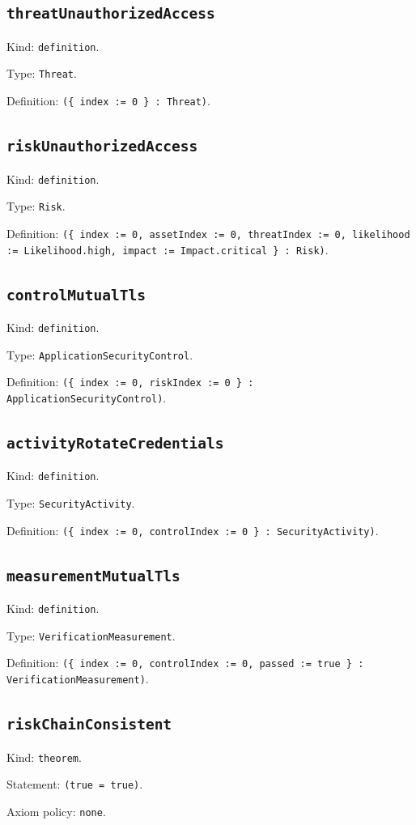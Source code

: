 \documentclass[11pt]{article}
\begin{document}
\subsection*{\texttt{threatUnauthorizedAccess}}
\noindent Kind: \texttt{definition}.\par
\noindent Type: \texttt{Threat}.\par
\noindent Definition: \texttt{(\{ index := 0 \} : Threat)}.\par
\subsection*{\texttt{riskUnauthorizedAccess}}
\noindent Kind: \texttt{definition}.\par
\noindent Type: \texttt{Risk}.\par
\noindent Definition: \texttt{(\{ index := 0, assetIndex := 0, threatIndex := 0, likelihood := Likelihood.high, impact := Impact.critical \} : Risk)}.\par
\subsection*{\texttt{controlMutualTls}}
\noindent Kind: \texttt{definition}.\par
\noindent Type: \texttt{ApplicationSecurityControl}.\par
\noindent Definition: \texttt{(\{ index := 0, riskIndex := 0 \} : ApplicationSecurityControl)}.\par
\subsection*{\texttt{activityRotateCredentials}}
\noindent Kind: \texttt{definition}.\par
\noindent Type: \texttt{SecurityActivity}.\par
\noindent Definition: \texttt{(\{ index := 0, controlIndex := 0 \} : SecurityActivity)}.\par
\subsection*{\texttt{measurementMutualTls}}
\noindent Kind: \texttt{definition}.\par
\noindent Type: \texttt{VerificationMeasurement}.\par
\noindent Definition: \texttt{(\{ index := 0, controlIndex := 0, passed := true \} : VerificationMeasurement)}.\par
\subsection*{\texttt{riskChainConsistent}}
\noindent Kind: \texttt{theorem}.\par
\noindent Statement: \texttt{(true = true)}.\par
\noindent Axiom policy: \texttt{none}.\par
\end{document}
